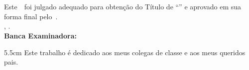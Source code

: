 \documentclass[
	12pt,				%
	oneside,			%
	a4paper,			%
	chapter=TITLE,		%
	section=TITLE,		%
	english,			%
	brazil				%
	]{abntex2}
\begin{document}
\begin{folhadeaprovacao}
	\OnehalfSpacing
	\centering
	\imprimirautor\\%
	\vspace*{10pt}		
	\textbf{\imprimirtitulo}%
	\ifnotempty{\imprimirsubtitulo}{:~\imprimirsubtitulo}\\%
	\vspace*{\baselineskip}
	Este~\imprimirtipotrabalho~foi julgado adequado para obtenção do Título de “\imprimirformacao” e aprovado em sua forma final pelo~\imprimirprograma. \\
		\vspace*{\baselineskip}
	\imprimirlocal, \imprimirdata. \\
	\vspace*{2\baselineskip}
	\vspace*{2\baselineskip}
	\textbf{Banca Examinadora:} \\
	\vspace*{\baselineskip}
	\assinatura{\OnehalfSpacing\imprimirorientador \\ \imprimirorientadorRotulo}
	\vspace*{\baselineskip}

	\vspace*{\baselineskip}


\end{folhadeaprovacao}

\begin{dedicatoria}
	\vspace*{\fill}
	\noindent
	\begin{adjustwidth*}{}{5.5cm}     
		Este trabalho é dedicado aos meus colegas de classe e aos meus queridos pais.
	\end{adjustwidth*}
\end{dedicatoria}
\end{document}
